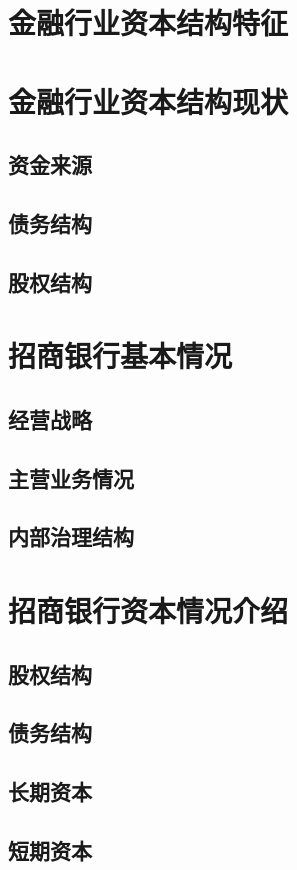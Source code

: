 \section{金融行业资本结构特征}

\section{金融行业资本结构现状}
\subsection{资金来源}
\subsection{债务结构}
\subsection{股权结构}

\section{招商银行基本情况}
\subsection{经营战略}
\subsection{主营业务情况}
\subsection{内部治理结构}

\section{招商银行资本情况介绍}
\subsection{股权结构}
\subsection{债务结构}
\subsection{长期资本}
\subsection{短期资本}


